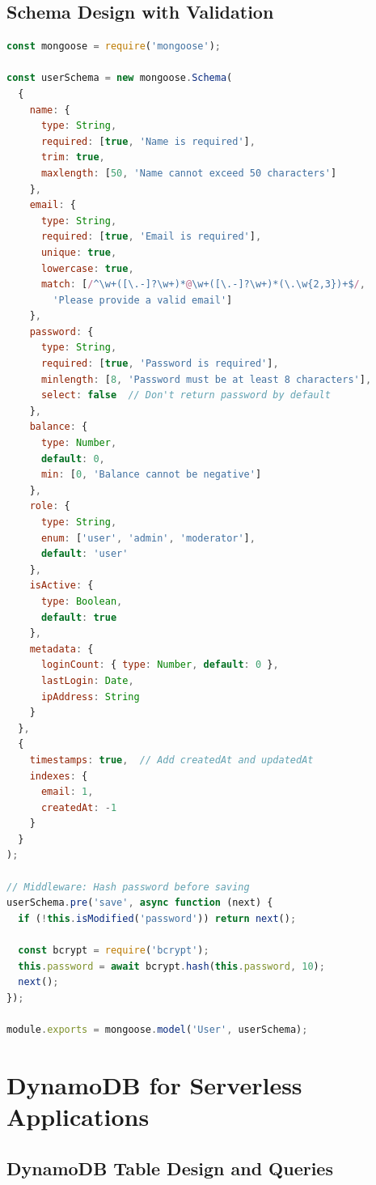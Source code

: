 \subsection{Schema Design with Validation}

\begin{lstlisting}[language=JavaScript, caption=MongoDB Schema with Built-in Validation]
const mongoose = require('mongoose');

const userSchema = new mongoose.Schema(
  {
    name: {
      type: String,
      required: [true, 'Name is required'],
      trim: true,
      maxlength: [50, 'Name cannot exceed 50 characters']
    },
    email: {
      type: String,
      required: [true, 'Email is required'],
      unique: true,
      lowercase: true,
      match: [/^\w+([\.-]?\w+)*@\w+([\.-]?\w+)*(\.\w{2,3})+$/, 
        'Please provide a valid email']
    },
    password: {
      type: String,
      required: [true, 'Password is required'],
      minlength: [8, 'Password must be at least 8 characters'],
      select: false  // Don't return password by default
    },
    balance: {
      type: Number,
      default: 0,
      min: [0, 'Balance cannot be negative']
    },
    role: {
      type: String,
      enum: ['user', 'admin', 'moderator'],
      default: 'user'
    },
    isActive: {
      type: Boolean,
      default: true
    },
    metadata: {
      loginCount: { type: Number, default: 0 },
      lastLogin: Date,
      ipAddress: String
    }
  },
  {
    timestamps: true,  // Add createdAt and updatedAt
    indexes: {
      email: 1,
      createdAt: -1
    }
  }
);

// Middleware: Hash password before saving
userSchema.pre('save', async function (next) {
  if (!this.isModified('password')) return next();
  
  const bcrypt = require('bcrypt');
  this.password = await bcrypt.hash(this.password, 10);
  next();
});

module.exports = mongoose.model('User', userSchema);
\end{lstlisting}

\section{DynamoDB for Serverless Applications}

\subsection{DynamoDB Table Design and Queries}

